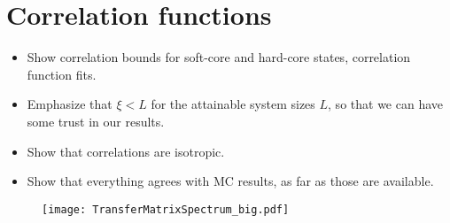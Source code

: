 
\section{Correlation functions}

\begin{itemize}
\item Show correlation bounds for soft-core and hard-core states, correlation function fits.
\item Emphasize that $\xi < L$ for the attainable system sizes $L$, so that we can have some trust in our results.
\item Show that correlations are isotropic.
\item Show that everything agrees with MC results, as far as those are available.
\end{itemize}

\begin{figure}[H]
	\centering
		\texttt{[image: TransferMatrixSpectrum\_big.pdf]}
\end{figure}

